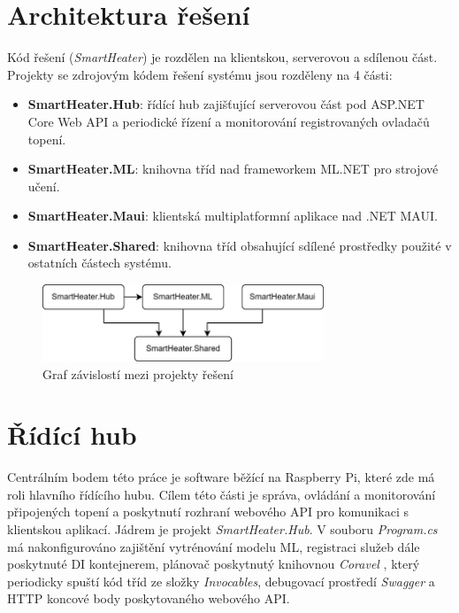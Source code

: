 \section{Architektura řešení}
Kód řešení ({\it SmartHeater}) je rozdělen na klientskou, serverovou a sdílenou část. Projekty se zdrojovým kódem řešení systému jsou rozděleny na 4 části:
\begin{itemize}
    \item \textbf{SmartHeater.Hub}: řídící hub zajišťující serverovou část pod ASP.NET Core Web API a periodické řízení a monitorování registrovaných ovladačů topení.
    \item \textbf{SmartHeater.ML}: knihovna tříd nad frameworkem ML.NET pro strojové učení.
    \item \textbf{SmartHeater.Maui}: klientská multiplatformní aplikace nad .NET MAUI.
    \item \textbf{SmartHeater.Shared}: knihovna tříd obsahující sdílené prostředky použité v ostatních částech systému.
\end{itemize}

\begin{figure}[hbt]
\centering
\includegraphics[width=0.75\textwidth]{obrazky-figures/smartheater-architecture.png}
\caption{Graf závislostí mezi projekty řešení}
\end{figure}

\pagebreak

\section{Řídící hub}
Centrálním bodem této práce je software běžící na Raspberry Pi, které zde má roli hlavního řídícího hubu. Cílem této části je správa, ovládání a monitorování připojených topení a poskytnutí rozhraní webového API pro komunikaci s klientskou aplikací. Jádrem je projekt {\it SmartHeater.Hub}. V souboru {\it Program.cs} má nakonfigurováno zajištění vytrénování modelu ML, registraci služeb dále poskytnuté DI kontejnerem, plánovač poskytnutý knihovnou {\it Coravel} \cite{coravel}, který periodicky spuští kód tříd ze složky {\it Invocables}, debugovací prostředí {\it Swagger} a HTTP koncové body poskytovaného webového API.

